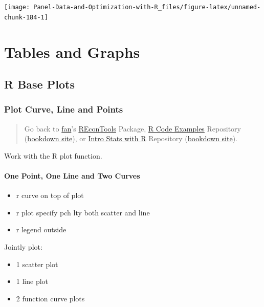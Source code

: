 \documentclass[
]{book}
\providecommand{\tightlist}{%
  \setlength{\itemsep}{0pt}\setlength{\parskip}{0pt}}
\begin{document}
\begin{center}\texttt{[image: Panel-Data-and-Optimization-with-R\_files/figure-latex/unnamed-chunk-184-1]} \end{center}

\hypertarget{tables-and-graphs}{%
\chapter{Tables and Graphs}\label{tables-and-graphs}}

\hypertarget{r-base-plots}{%
\section{R Base Plots}\label{r-base-plots}}

\hypertarget{plot-curve-line-and-points}{%
\subsection{Plot Curve, Line and Points}\label{plot-curve-line-and-points}}

\begin{quote}
Go back to \href{http://fanwangecon.github.io/}{fan}'s \href{https://fanwangecon.github.io/REconTools/}{REconTools} Package, \href{https://fanwangecon.github.io/R4Econ/}{R Code Examples} Repository (\href{https://fanwangecon.github.io/R4Econ/bookdown}{bookdown site}), or \href{https://fanwangecon.github.io/Stat4Econ/}{Intro Stats with R} Repository (\href{https://fanwangecon.github.io/Stat4Econ/bookdown}{bookdown site}).
\end{quote}

Work with the R plot function.

\hypertarget{one-point-one-line-and-two-curves}{%
\subsubsection{One Point, One Line and Two Curves}\label{one-point-one-line-and-two-curves}}

\begin{itemize}
\tightlist
\item
  r curve on top of plot
\item
  r plot specify pch lty both scatter and line
\item
  r legend outside
\end{itemize}

Jointly plot:

\begin{itemize}
\tightlist
\item
  1 scatter plot
\item
  1 line plot
\item
  2 function curve plots
\end{itemize}
\end{document}
